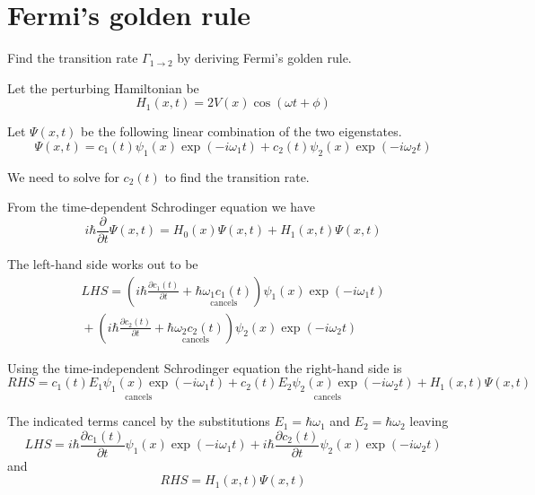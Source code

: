 

\section*{Fermi's golden rule}

Find the transition rate $\Gamma_{1\rightarrow2}$
by deriving Fermi's golden rule.

\bigskip

Let the perturbing Hamiltonian be
\begin{equation*}
H_1(x,t)=2V(x)\cos(\omega t+\phi)
\end{equation*}

Let $\Psi(x,t)$ be the following linear combination of the two eigenstates.
\begin{equation*}
\Psi(x,t)=c_1(t)\psi_1(x)\exp(-i\omega_1t)+c_2(t)\psi_2(x)\exp(-i\omega_2t)
\end{equation*}

We need to solve for $c_2(t)$ to find the transition rate.

\bigskip

From the time-dependent Schrodinger equation we have
\begin{equation*}
i\hbar\frac{\partial}{\partial t}\Psi(x,t)=H_0(x)\Psi(x,t)+H_1(x,t)\Psi(x,t)
\end{equation*}

The left-hand side works out to be
\begin{multline*}
LHS=\left(i\hbar\frac{\partial c_1(t)}{\partial t}+
\underset{\text{cancels}}
{\hbar\omega_1c_1(t)}
\right)
\psi_1(x)\exp(-i\omega_1t)
\\
{}+\left(i\hbar\frac{\partial c_2(t)}{\partial t}+
\underset{\text{cancels}}
{\hbar\omega_2c_2(t)}
\right)
\psi_2(x)\exp(-i\omega_2t)
\end{multline*}

Using the time-independent Schrodinger equation the right-hand side is
\begin{equation*}
RHS=
\underset{\text{cancels}}
{c_1(t)E_1\psi_1(x)\exp(-i\omega_1t)}
+
\underset{\text{cancels}}
{c_2(t)E_2\psi_2(x)\exp(-i\omega_2t)}
+H_1(x,t)\Psi(x,t)
\end{equation*}

The indicated terms cancel by the substitutions
$E_1=\hbar\omega_1$ and $E_2=\hbar\omega_2$ leaving
\begin{equation*}
LHS=i\hbar\frac{\partial c_1(t)}{\partial t}\psi_1(x)\exp(-i\omega_1t)
+i\hbar\frac{\partial c_2(t)}{\partial t}\psi_2(x)\exp(-i\omega_2t)
\end{equation*}
%
and
\begin{equation*}
RHS=H_1(x,t)\Psi(x,t)
\end{equation*}

